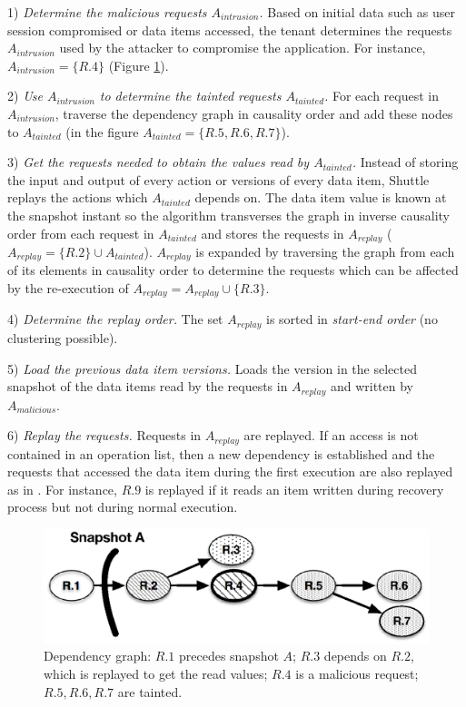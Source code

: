 {1)} \textit{Determine the malicious requests $A_{intrusion}$.}
  Based on initial data such as user session compromised or data items accessed, the tenant determines the requests $A_{intrusion}$ used by the attacker to compromise the application. For instance, $A_{intrusion} = \{R.4\} $ (Figure \ref{fig:selectiveGraph}).
  
{2)} \textit{Use $A_{intrusion}$ to determine the tainted requests $A_{tainted}$.}
  For each request in $A_{intrusion}$, traverse the dependency graph in causality order and add these nodes to $A_{tainted}$ (in the figure $A_{tainted} = \{R.5,R.6,R.7\}$).

{3)} \textit{Get the requests needed to obtain the values read by $A_{tainted}$.} %
  Instead of storing the input and output of every action or versions of every data item, Shuttle replays the actions which $A_{tainted}$ depends on. The data item value is known at the snapshot instant so the algorithm transverses the graph in inverse causality order from each request in $A_{tainted}$ and stores the requests in $A_{replay}$ ($A_{replay} = \{R.2\} \cup A_{tainted}$). $A_{replay}$ is expanded by traversing the graph from each of its elements in causality order to determine the requests which can be affected by the re-execution of $A_{replay} = A_{replay} \cup \{R.3\}$. 

{4)} \textit{Determine the replay order.} 
  The set $A_{replay}$ is sorted in \emph{start-end order} (no clustering possible).

{5)} \textit{Load the previous data item versions.}
  Loads the version in the selected snapshot of the data items read by the requests in $A_{replay}$ and written by $A_{malicious}$.

{6)} \textit{Replay the requests.}
  Requests in $A_{replay}$ are replayed. If an access is not contained in an operation list, then a new dependency is established and the requests that accessed the data item during the first execution are also replayed as in \cite{retro}. For instance, $R.9$ is replayed if it reads an item written during recovery process but not during normal execution. 

\begin{figure}
  \centering
  \includegraphics[width=0.7\linewidth]{images/selectiveDependency_paper}
  \caption{{Dependency graph:} $R.1$ precedes snapshot $A$; $R.3$ depends on $R.2$, which is replayed to get the read values; $R.4$ is a malicious request; $R.5,R.6,R.7$ are tainted.}
  \label{fig:selectiveGraph}
\end{figure}



